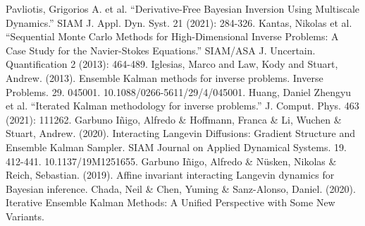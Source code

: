\documentclass[12pt]{article}
\begin{document}
\begin{thebibliography}{20}
 Pavliotis, Grigorios A. et al. “Derivative-Free Bayesian Inversion Using Multiscale Dynamics.” SIAM J. Appl. Dyn. Syst. 21 (2021): 284-326. 
 Kantas, Nikolas et al. “Sequential Monte Carlo Methods for High-Dimensional Inverse Problems: A Case Study for the Navier-Stokes Equations.” SIAM/ASA J. Uncertain. Quantification 2 (2013): 464-489. 
 Iglesias, Marco and Law, Kody and Stuart, Andrew. (2013). Ensemble Kalman methods for inverse problems. Inverse Problems. 29. 045001. 10.1088/0266-5611/29/4/045001. 
 Huang, Daniel Zhengyu et al. “Iterated Kalman methodology for inverse problems.” J. Comput. Phys. 463 (2021): 111262.
 Garbuno Iñigo, Alfredo \& Hoffmann, Franca \& Li, Wuchen \& Stuart, Andrew. (2020). Interacting Langevin Diffusions: Gradient Structure and Ensemble Kalman Sampler. SIAM Journal on Applied Dynamical Systems. 19. 412-441. 10.1137/19M1251655. 
 Garbuno Iñigo, Alfredo \& Nüsken, Nikolas \& Reich, Sebastian. (2019). Affine invariant interacting Langevin dynamics for Bayesian inference. 
 Chada, Neil \& Chen, Yuming \& Sanz-Alonso, Daniel. (2020). Iterative Ensemble Kalman Methods: A Unified Perspective with Some New Variants. 
\end{thebibliography}
\end{document}
